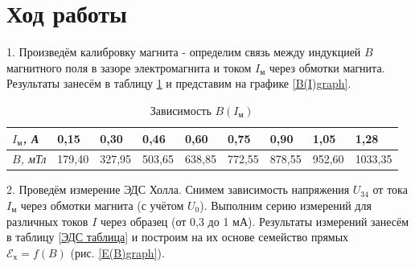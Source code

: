 \documentclass[a4paper, 12pt]{article}
\begin{document}
\newpage

\section{Ход работы}

1. Произведём калибровку магнита - определим связь между индукцией $B$ магнитного поля  в зазоре электромагнита и током $I_{м}$ через обмотки магнита. Результаты занесём в таблицу \ref{B(I)tab} и представим на графике \ref{B(I)graph}.


\begin{table}[h]	
\caption{Зависимость $B(I_\text{м})$}
\begin{tabular}{|l|l|l|l|l|l|l|l|l|} 	
\hline
\textit{$I_\text{м}$, А}   & 0,15   & 0,30   & 0,46   & 0,60   & 0,75   & 0,90   & 1,05   & 1,28    \\
\hline
\textit{$B$, мТл} & 179,40 & 327,95 & 503,65 & 638,85 & 772,55 & 878,55 & 952,60 & 1033,35 \\
\hline
\end{tabular}
\label{B(I)tab}
\end{table}

2. Проведём измерение ЭДС Холла. Снимем зависимость напряжения $U_{34}$ от тока $I_{м}$ через обмотки магнита (с учётом $U_0$). Выполним серию измерений для различных токов $I$ через образец (от 0,3 до 1 мА). Результаты измерений занесём в таблицу \ref{ЭДС таблица} и построим на их основе семейство прямых $\mathscr{E_\text{х}} = f(B)$ (рис. \ref{E(B)graph}).
\end{document}
